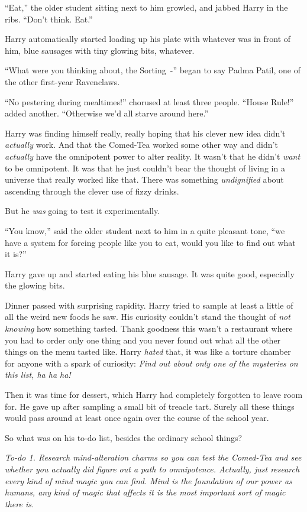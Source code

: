``Eat,'' the older student sitting next to him growled, and jabbed Harry in the ribs. ``Don't think. Eat.''

Harry automatically started loading up his plate with whatever was in front of him, blue sausages with tiny glowing bits, whatever.

``What were you thinking about, the Sorting~-'' began to say Padma Patil, one of the other first-year Ravenclaws.

``No pestering during mealtimes!'' chorused at least three people. ``House Rule!'' added another. ``Otherwise we'd all starve around here.''

Harry was finding himself really, really hoping that his clever new idea didn't \emph{actually} work. And that the Comed-Tea worked some other way and didn't \emph{actually} have the omnipotent power to alter reality. It wasn't that he didn't \emph{want} to be omnipotent. It was that he just couldn't bear the thought of living in a universe that really worked like that. There was something \emph{undignified} about ascending through the clever use of fizzy drinks.

But he \emph{was} going to test it experimentally.

``You know,'' said the older student next to him in a quite pleasant tone, ``we have a system for forcing people like you to eat, would you like to find out what it is?''

Harry gave up and started eating his blue sausage. It was quite good, especially the glowing bits.

Dinner passed with surprising rapidity. Harry tried to sample at least a little of all the weird new foods he saw. His curiosity couldn't stand the thought of \emph{not knowing} how something tasted. Thank goodness this wasn't a restaurant where you had to order only one thing and you never found out what all the other things on the menu tasted like. Harry \emph{hated} that, it was like a torture chamber for anyone with a spark of curiosity: \emph{Find out about only one of the mysteries on this list, ha ha ha!}

Then it was time for dessert, which Harry had completely forgotten to leave room for. He gave up after sampling a small bit of treacle tart. Surely all these things would pass around at least once again over the course of the school year.

So what was on his to-do list, besides the ordinary school things?

\emph{To-do 1. Research mind-alteration charms so you can test the Comed-Tea and see whether you actually did figure out a path to omnipotence. Actually, just research every kind of mind magic you can find. Mind is the foundation of our power as humans, any kind of magic that affects it is the most important sort of magic there is.}


